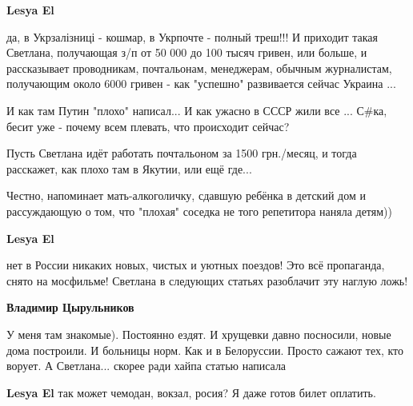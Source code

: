 \begin{itemize}
\begin{itemize}
 
\textbf{Lesya El} 

да, в Укрзалізниці - кошмар, в Укрпочте - полный треш!!! И приходит такая
Светлана, получающая з/п от 50 000 до 100 тысяч гривен, или больше, и
рассказывает проводникам, почтальонам, менеджерам, обычным журналистам,
получающим около 6000 гривен - как "успешно" развивается сейчас Украина ... 

И как там Путин "плохо" написал... И как ужасно в СССР жили все ...  С\#ка,
бесит уже - почему всем плевать, что происходит сейчас? 

Пусть Светлана идёт работать почтальоном за 1500 грн./месяц, и тогда расскажет,
как плохо там в Якутии, или ещё где... 

Честно, напоминает мать-алкоголичку, сдавшую ребёнка в детский дом и
рассуждающую о том, что "плохая" соседка не того репетитора наняла детям))


 
\textbf{Lesya El} 

нет в России никаких новых, чистых и уютных поездов! Это всё пропаганда, снято
на мосфильме! Светлана в следующих статьях разоблачит эту наглую ложь!

 
\textbf{Владимир Цырульников} 

У меня там знакомые). Постоянно ездят. И хрущевки давно посносили, новые дома
построили. И больницы норм. Как и в Белоруссии. Просто сажают тех, кто ворует.
А Светлана... скорее ради хайпа статью написала

 
\textbf{Lesya El} так может чемодан, вокзал, росия? Я даже готов билет оплатить.


\end{itemize}
\end{itemize}
